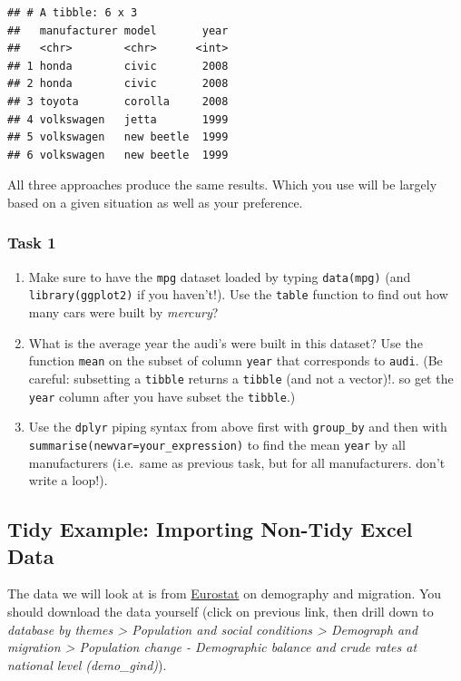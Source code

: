 \documentclass[]{book}
\providecommand{\tightlist}{%
  \setlength{\itemsep}{0pt}\setlength{\parskip}{0pt}}
\begin{document}
\begin{verbatim}
## # A tibble: 6 x 3
##   manufacturer model       year
##   <chr>        <chr>      <int>
## 1 honda        civic       2008
## 2 honda        civic       2008
## 3 toyota       corolla     2008
## 4 volkswagen   jetta       1999
## 5 volkswagen   new beetle  1999
## 6 volkswagen   new beetle  1999
\end{verbatim}

All three approaches produce the same results. Which you use will be
largely based on a given situation as well as your preference.

\subsubsection{Task 1}\label{task-1}

\begin{enumerate}
\def\labelenumi{\arabic{enumi}.}
\tightlist
\item
  Make sure to have the \texttt{mpg} dataset loaded by typing
  \texttt{data(mpg)} (and \texttt{library(ggplot2)} if you haven't!).
  Use the \texttt{table} function to find out how many cars were built
  by \emph{mercury}?
\item
  What is the average year the audi's were built in this dataset? Use
  the function \texttt{mean} on the subset of column \texttt{year} that
  corresponds to \texttt{audi}. (Be careful: subsetting a
  \texttt{tibble} returns a \texttt{tibble} (and not a vector)!. so get
  the \texttt{year} column after you have subset the \texttt{tibble}.)
\item
  Use the \texttt{dplyr} piping syntax from above first with
  \texttt{group\_by} and then with
  \texttt{summarise(newvar=your\_expression)} to find the mean
  \texttt{year} by all manufacturers (i.e.~same as previous task, but
  for all manufacturers. don't write a loop!).
\end{enumerate}

\subsection{Tidy Example: Importing Non-Tidy Excel
Data}\label{tidy-example-importing-non-tidy-excel-data}

The data we will look at is from
\href{http://ec.europa.eu/eurostat/data/database}{Eurostat} on
demography and migration. You should download the data yourself (click
on previous link, then drill down to \emph{database by themes
\textgreater{} Population and social conditions \textgreater{} Demograph
and migration \textgreater{} Population change - Demographic balance and
crude rates at national level (demo\_gind)}).
\end{document}
